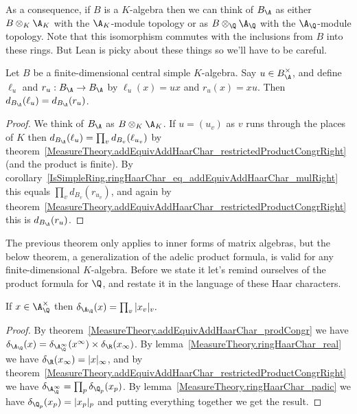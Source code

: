 As a consequence, if $B$ is a $K$-algebra then we can think of $B_{\A}$ as either $B\otimes_K\A_K$
with the $\A_K$-module topology or as $B\otimes_{\Q}\A_{\Q}$ with the $\A_{\Q}$-module
topology. Note that this isomorphism commutes with the inclusions from $B$ into these rings.
But Lean is picky about these things so we'll have to be careful.

\begin{theorem}
  \label{NumberField.AdeleRing.isSentralSimple_addHaarScalarFactor_left_mul_eq_right_mul}
  Let $B$ be a finite-dimensional central simple $K$-algebra.
  Say $u\in B_{\A}^\times$, and define $\ell_u$ and $r_u:B_{\A}\to B_{\A}$ by
  $\ell_u(x)=ux$ and $r_u(x)=xu$. Then $d_{B_{\A}}(\ell_u)=d_{B_{\A}}(r_u)$.
\end{theorem}
\begin{proof}
  We think of $B_{\A}$ as $B\otimes_K\A_K$.
  If $u=(u_v)$ as $v$ runs through the places of $K$ then
  $d_{B_{\A}}(\ell_u)=\prod_v d_{B_v}(\ell_{u_v})$ by
  theorem~\ref{MeasureTheory.addEquivAddHaarChar_restrictedProductCongrRight} (and the product is finite).
  By corollary~\ref{IsSimpleRing.ringHaarChar_eq_addEquivAddHaarChar_mulRight}
  this equals $\prod_v d_{B_v}(r_{u_v})$, and again by
  theorem~\ref{MeasureTheory.addEquivAddHaarChar_restrictedProductCongrRight} this is $d_{B_{\A}}(r_u)$.
\end{proof}

The previous theorem only applies to inner forms of matrix algebras, but the below theorem,
a generalization of the adelic product formula, is valid for any finite-dimensional
$K$-algebra. Before we state it let's remind ourselves of the product formula for $\Q$,
and restate it in the language of these Haar characters.

\begin{lemma}
  \label{MeasureTheory.ringHaarChar_adeles_rat}
  If $x\in\A_{\Q}^\times$ then $\delta_{\A_{\Q}}(x)=\prod_v|x_v|_v.$
\end{lemma}
\begin{proof}
  By theorem~\ref{MeasureTheory.addEquivAddHaarChar_prodCongr}
  we have $\delta_{\A_{\Q}}(x)=\delta_{\A_{\Q}^\infty}(x^\infty)\times\delta_{\R}(x_\infty)$.
  By lemma~\ref{MeasureTheory.ringHaarChar_real} we have $\delta_{\R}(x_\infty)=|x|_\infty$, and by
  theorem~\ref{MeasureTheory.addEquivAddHaarChar_restrictedProductCongrRight} we have
  $\delta_{\A_{\Q}^\infty}=\prod_p\delta_{\Q_p}(x_p)$. By lemma~\ref{MeasureTheory.ringHaarChar_padic}
  we have $\delta_{\Q_p}(x_p)=|x_p|_p$ and putting everything together we get the result.
\end{proof}

